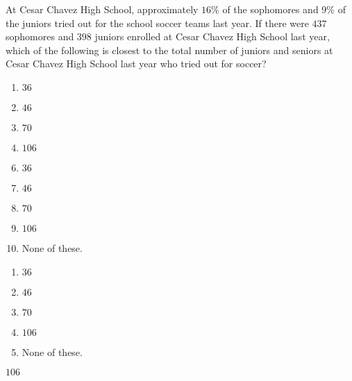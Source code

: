  
At Cesar Chavez High School, approximately $16\%$ of the sophomores and $9\%$ of the juniors tried out for the school soccer teams last year.  If there were $437$ sophomores and $398$ juniors enrolled at Cesar Chavez High School last year, which of the following is closest to the total number of juniors and seniors at Cesar Chavez High School last year who tried out for soccer?


\ifsat
	\begin{enumerate}[label=\Alph*)]
		\item $36 $ 
		\item $46 $ 
		\item $70 $ 
		\item $106 $ %
	\end{enumerate}
\else
\fi

\ifacteven
	\begin{enumerate}[label=\textbf{\Alph*.},itemsep=\fill,align=left]
		\setcounter{enumii}{5}
		\item $36 $ 
		\item $46 $ 
		\item $70 $ 
		\addtocounter{enumii}{1}
		\item $106 $ %
		\item None of these. 
	\end{enumerate}
\else
\fi

\ifactodd
	\begin{enumerate}[label=\textbf{\Alph*.},itemsep=\fill,align=left]
		\item $36 $ 
		\item $46 $ 
		\item $70 $ 
		\item $106 $ %
		\item None of these. 
	\end{enumerate}
\else
\fi

\ifgridin
 $106 $ %

\else
\fi

